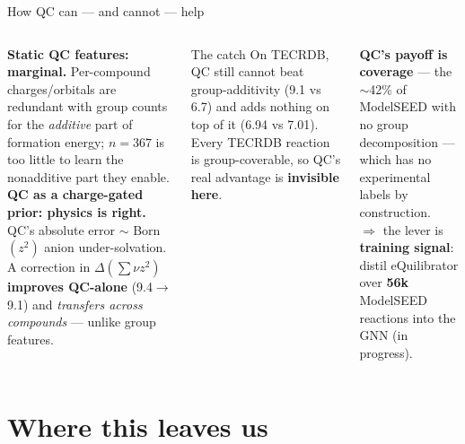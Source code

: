 \documentclass[aspectratio=169,11pt]{beamer}
\newcommand{\win}[1]{\textcolor{good}{\textbf{#1}}}
\begin{document}
\begin{frame}{How QC can — and cannot — help}
  \begin{columns}[T]
      \textbf{Static QC features: marginal.} Per-compound charges/orbitals are
      redundant with group counts for the \emph{additive} part of formation
      energy; $n\!=\!367$ is too little to learn the nonadditive part they enable.
      \\[0.4em]
      \textbf{QC as a charge-gated prior: physics is right.} QC's absolute error
      $\sim$ Born $(z^2)$ anion under-solvation. A correction in
      $\Delta(\sum\nu z^2)$ \win{improves QC-alone} (9.4$\to$9.1) and
      \emph{transfers across compounds} — unlike group features.
      \begin{alertblock}{The catch}
        On TECRDB, QC still cannot beat group-additivity (9.1 vs 6.7) and adds
        nothing on top of it (6.94 vs 7.01). Every TECRDB reaction is
        group-coverable, so QC's real advantage is \textbf{invisible here}.
      \end{alertblock}
      \textbf{QC's payoff is coverage} — the $\sim$42\% of ModelSEED with no
      group decomposition — which has no experimental labels by construction.
      \\[0.3em]
      $\Rightarrow$ the lever is \textbf{training signal}: distil eQuilibrator
      over \textbf{56k} ModelSEED reactions into the GNN (in progress).
  \end{columns}
\end{frame}

\section{Where this leaves us}
\end{document}
